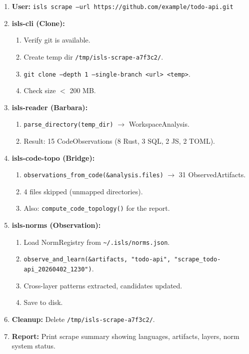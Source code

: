 \documentclass[11pt,a4paper]{article}
\begin{document}
\begin{enumerate}
\item \textbf{User:}
      \texttt{isls scrape --url https://github.com/example/todo-api.git}

\item \textbf{isls-cli (Clone):}
      \begin{enumerate}[nosep,label=\alph*.]
      \item Verify git is available.
      \item Create temp dir \texttt{/tmp/isls-scrape-a7f3c2/}.
      \item \texttt{git clone --depth 1 --single-branch <url> <temp>}.
      \item Check size $<$ 200 MB.
      \end{enumerate}

\item \textbf{isls-reader (Barbara):}
      \begin{enumerate}[nosep,label=\alph*.]
      \item \texttt{parse\_directory(temp\_dir)} $\to$ WorkspaceAnalysis.
      \item Result: 15 CodeObservations (8 Rust, 3 SQL, 2 JS, 2 TOML).
      \end{enumerate}

\item \textbf{isls-code-topo (Bridge):}
      \begin{enumerate}[nosep,label=\alph*.]
      \item \texttt{observations\_from\_code(\&analysis.files)} $\to$
            31 ObservedArtifacts.
      \item 4 files skipped (unmapped directories).
      \item Also: \texttt{compute\_code\_topology()} for the report.
      \end{enumerate}

\item \textbf{isls-norms (Observation):}
      \begin{enumerate}[nosep,label=\alph*.]
      \item Load NormRegistry from \texttt{\textasciitilde/.isls/norms.json}.
      \item \texttt{observe\_and\_learn(\&artifacts, "todo-api",
            "scrape\_todo-api\_20260402\_1230")}.
      \item Cross-layer patterns extracted, candidates updated.
      \item Save to disk.
      \end{enumerate}

\item \textbf{Cleanup:}
      Delete \texttt{/tmp/isls-scrape-a7f3c2/}.

\item \textbf{Report:}
      Print scrape summary showing languages, artifacts, layers,
      norm system status.
\end{enumerate}
\end{document}
